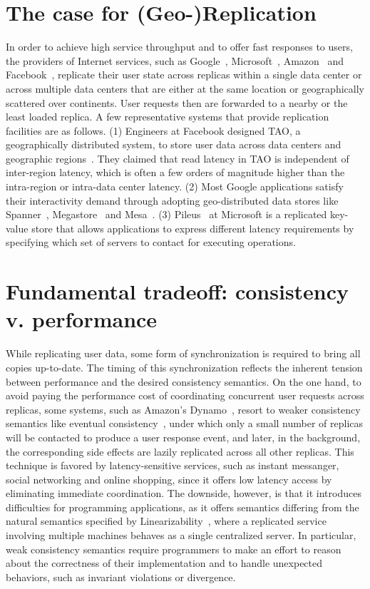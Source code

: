 \section{The case for (Geo-)Replication}
In order to achieve high service throughput and to offer fast responses to 
users, the providers of Internet services, such as Google~\cite{GoogleWeb}, 
Microsoft~\cite{MicrosoftWeb}, Amazon~\cite{AmazonWeb} and 
Facebook~\cite{FacebookWeb}, replicate their user state across replicas within a 
single data center or across multiple data centers that are either at the
same location or geographically scattered over continents. User requests then 
are forwarded
to a nearby or the least loaded replica. A few representative systems that provide 
replication facilities are as follows. (1) Engineers at Facebook designed TAO, a 
geographically distributed system, to store user data across data centers and 
geographic regions~\cite{Bronson2013TAO}. They claimed that read
latency in TAO is independent of inter-region latency, which is often a few 
orders of magnitude higher than the intra-region or intra-data center latency. 
(2) Most Google applications satisfy their interactivity demand through adopting 
geo-distributed data stores like Spanner~\cite{Corbett2012Spanner}, 
Megastore~\cite{Baker2011Megastore} and Mesa~\cite{Gupta2014Mesa}. (3) Pileus~\cite{Terry2013SLA} at Microsoft 
is a replicated key-value store that allows applications to express different 
latency requirements by specifying which set of servers to contact for executing 
operations.

\section{Fundamental tradeoff: consistency v. performance}
While replicating user data, some form of synchronization is required
to bring all copies up-to-date. The timing of this synchronization reflects
the inherent tension between performance and the desired consistency 
semantics.
On the one hand, to avoid paying the performance cost of coordinating concurrent 
user requests
across replicas, some systems, such as Amazon's 
Dynamo~\cite{Decandia2007Dynamo}, resort
to weaker consistency semantics like eventual 
consistency~\cite{Burckhardt2013Eventual, Saito2005Optimistic}, under which only 
a small number of replicas will be contacted to produce a user response event, 
and later, in the background, the corresponding side effects are lazily 
replicated across all other replicas. This technique is favored by
latency-sensitive services, such as instant messanger, social networking and 
online shopping, since it offers low latency access by eliminating immediate 
coordination.
The downside, however, is that it introduces difficulties for programming 
applications, as it offers semantics differing from the natural semantics 
specified by Linearizability~\cite{Herlihy1990Linearizability},
where a replicated service involving multiple machines behaves as a single 
centralized server. In particular, weak consistency semantics require 
programmers to make an effort to reason about the correctness of
their implementation and to handle unexpected behaviors, such as invariant 
violations or divergence.

